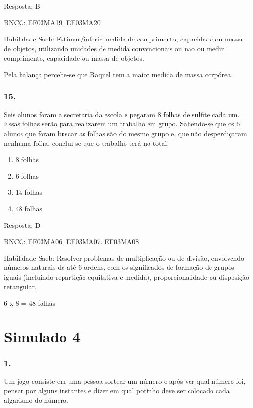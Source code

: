 Resposta: B

BNCC: EF03MA19, EF03MA20

Habilidade Saeb: Estimar/inferir medida de comprimento, capacidade ou
massa de objetos, utilizando unidades de medida convencionais ou não ou
medir comprimento, capacidade ou massa de objetos.

Pela balança percebe-se que Raquel tem a maior medida de massa corpórea.

\subsubsection{15. }\label{section-170}

Seis alunos foram a secretaria da escola e pegaram 8 folhas de sulfite
cada um. Essas folhas serão para realizarem um trabalho em grupo.
Sabendo-se que os 6 alunos que foram buscar as folhas são do mesmo grupo
e, que não desperdiçaram nenhuma folha, conclui-se que o trabalho terá
no total:

\begin{enumerate}
\def\labelenumi{\alph{enumi})}
\item
  8 folhas
\item
  6 folhas
\item
  14 folhas
\item
  48 folhas
\end{enumerate}

Resposta: D

BNCC: EF03MA06, EF03MA07, EF03MA08

Habilidade Saeb: Resolver problemas de multiplicação ou de divisão,
envolvendo números naturais de até 6 ordens, com os significados de
formação de grupos iguais (incluindo repartição equitativa e medida),
proporcionalidade ou disposição retangular.

6 x 8 = 48 folhas

\section{Simulado 4}\label{simulado-4}

\subsubsection{1.}\label{section-171}

Um jogo consiste em uma pessoa sortear um número e após ver qual número
foi, pensar por alguns instantes e dizer em qual potinho deve ser
colocado cada algarismo do número.


